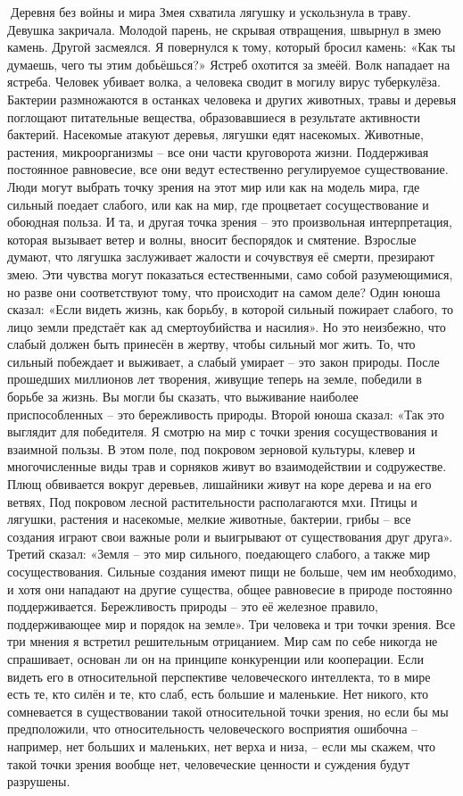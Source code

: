 \documentclass[a4paper]{book}
\begin{document}
Деревня без войны и мира
Змея схватила лягушку и ускользнула в траву. Девушка закричала. Молодой парень, не
скрывая отвращения, швырнул в змею камень. Другой засмеялся. Я повернулся к тому,
который бросил камень: «Как ты думаешь, чего ты этим добьёшься?»
Ястреб охотится за змеёй. Волк нападает на ястреба. Человек убивает волка, а человека
сводит в могилу вирус туберкулёза. Бактерии размножаются в останках человека и других
животных, травы и деревья поглощают питательные вещества, образовавшиеся в результате
активности бактерий. Насекомые атакуют деревья, лягушки едят насекомых.
Животные, растения, микроорганизмы – все они части круговорота жизни. Поддерживая
постоянное равновесие, все они ведут естественно регулируемое существование. Люди
могут выбрать точку зрения на этот мир или как на модель мира, где сильный поедает
слабого, или как на мир, где процветает сосуществование и обоюдная польза. И та, и другая
точка зрения – это произвольная интерпретация, которая вызывает ветер и волны, вносит
беспорядок и смятение.
Взрослые думают, что лягушка заслуживает жалости и сочувствуя её смерти, презирают
змею. Эти чувства могут показаться естественными, само собой разумеющимися, но разве
они соответствуют тому, что происходит на самом деле?
Один юноша сказал: «Если видеть жизнь, как борьбу, в которой сильный пожирает
слабого, то лицо земли предстаёт как ад смертоубийства и насилия». Но это неизбежно, что
слабый должен быть принесён в жертву, чтобы сильный мог жить. То, что сильный
побеждает и выживает, а слабый умирает – это закон природы. После прошедших миллионов
лет творения, живущие теперь на земле, победили в борьбе за жизнь. Вы могли бы сказать,
что выживание наиболее приспособленных – это бережливость природы.
Второй юноша сказал: «Так это выглядит для победителя. Я смотрю на мир с точки
зрения сосуществования и взаимной пользы. В этом поле, под покровом зерновой культуры,
клевер и многочисленные виды трав и сорняков живут во взаимодействии и содружестве.
Плющ обвивается вокруг деревьев, лишайники живут на коре дерева и на его ветвях, Под
покровом лесной растительности располагаются мхи. Птицы и лягушки, растения и
насекомые, мелкие животные, бактерии, грибы – все создания играют свои важные роли и
выигрывают от существования друг друга».
Третий сказал: «Земля – это мир сильного, поедающего слабого, а также мир
сосуществования. Сильные создания имеют пищи не больше, чем им необходимо, и хотя они
нападают на другие существа, общее равновесие в природе постоянно поддерживается.
Бережливость природы – это её железное правило, поддерживающее мир и порядок на
земле».
Три человека и три точки зрения. Все три мнения я встретил решительным отрицанием.
Мир сам по себе никогда не спрашивает, основан ли он на принципе конкуренции или
кооперации. Если видеть его в относительной перспективе человеческого интеллекта, то в
мире есть те, кто силён и те, кто слаб, есть большие и маленькие.
Нет никого, кто сомневается в существовании такой относительной точки зрения, но
если бы мы предположили, что относительность человеческого восприятия ошибочна –
например, нет больших и маленьких, нет верха и низа, – если мы скажем, что такой точки
зрения вообще нет, человеческие ценности и суждения будут разрушены.
\end{document}
